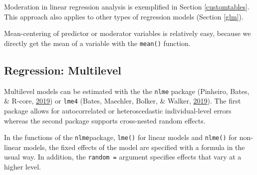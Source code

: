 \documentclass[doc,floatsintext]{apa6}
\newenvironment{Shaded}{\begin{snugshade}}{\end{snugshade}}
\newcommand{\KeywordTok}[1]{\textcolor[rgb]{0.13,0.29,0.53}{\textbf{#1}}}
\newcommand{\DataTypeTok}[1]{\textcolor[rgb]{0.13,0.29,0.53}{#1}}
\newcommand{\StringTok}[1]{\textcolor[rgb]{0.31,0.60,0.02}{#1}}
\newcommand{\CommentTok}[1]{\textcolor[rgb]{0.56,0.35,0.01}{\textit{#1}}}
\newcommand{\OtherTok}[1]{\textcolor[rgb]{0.56,0.35,0.01}{#1}}
\newcommand{\OperatorTok}[1]{\textcolor[rgb]{0.81,0.36,0.00}{\textbf{#1}}}
\newcommand{\NormalTok}[1]{#1}
\begin{document}
Moderation in linear regression analysis is exemplified in Section
\ref{customtables}. This approach also applies to other types of
regression models (Section \ref{glm}).

Mean-centering of predictor or moderator variables is relatively easy,
because we directly get the mean of a variable with the \texttt{mean()}
function.

\begin{Shaded}
\end{Shaded}

\subsection{Regression: Multilevel}\label{regression-multilevel}

Multilevel models can be estimated with the the \texttt{nlme} package
(Pinheiro, Bates, \& R-core, \protect\hyperlink{ref-R-nlme}{2019}) or
\texttt{lme4} (Bates, Maechler, Bolker, \& Walker,
\protect\hyperlink{ref-R-lme4}{2019}). The first package allows for
autocorrelated or heteroscedastic individual-level errors whereas the
second package supports cross-nested random effects.

In the functions of the \texttt{nlme}package, \texttt{lme()} for linear
models and \texttt{nlme()} for non-linear models, the fixed effects of
the model are specified with a formula in the usual way. In addition,
the \texttt{random\ =} argument specifies effects that vary at a higher
level.
\end{document}
